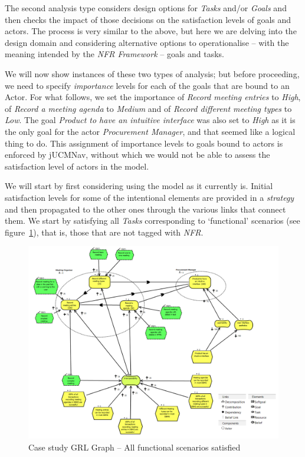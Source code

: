 \documentclass[dissertation,final]{softeng}
\begin{document}
The second analysis type considers design options for \emph{Tasks} and/or \emph{Goals} and then checks the impact of those decisions on the satisfaction levels of goals and actors. The process is very similar to the above, but here we are delving into the design domain and considering alternative options to operationalise -- with the meaning intended by the \emph{NFR Framework} -- goals and tasks.

We will now show instances of these two types of analysis; but before proceeding, we need to specify \emph{importance} levels for each of the goals that are bound to an Actor. For what follows, we set the importance of \emph{Record meeting entries} to \emph{High}, of \emph{Record a meeting agenda} to \emph{Medium} and of \emph{Record different meeting types} to \emph{Low}. The goal \emph{Product to have an intuitive interface} was also set to \emph{High} as it is the only goal for the actor \emph{Procurement Manager}, and that seemed like a logical thing to do. This assignment of importance levels to goals bound to actors is enforced by jUCMNav, without which we would not be able to assess the satisfaction level of actors in the model.
 
We will start by first considering using the model as it currently is. Initial satisfaction levels for some of the intentional elements are provided in a \emph{strategy} and then propagated to the other ones through the various links that connect them. We start by satisfying all \emph{Tasks} corresponding to `functional' scenarios (see figure~\ref{fig:casestudy-functionalscenarios}), that is, those that are not tagged with \emph{NFR}.

\begin{figure}
\includegraphics[width=\columnwidth]{casestudy-functionalscenarios}
\centering
\caption{Case study GRL Graph -- All functional scenarios satisfied}
\label{fig:casestudy-functionalscenarios}
\end{figure}
\end{document}
